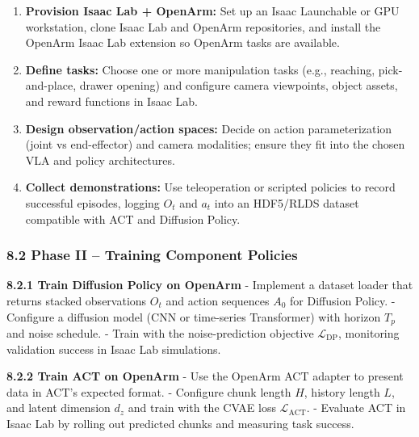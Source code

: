 \documentclass[
]{article}
\providecommand{\tightlist}{%
  \setlength{\itemsep}{0pt}\setlength{\parskip}{0pt}}
\theoremstyle{remark}
\begin{document}
\begin{enumerate}
\def\labelenumi{\arabic{enumi}.}
\tightlist
\item
  \textbf{Provision Isaac Lab + OpenArm:} Set up an Isaac Launchable or
  GPU workstation, clone Isaac Lab and OpenArm repositories, and install
  the OpenArm Isaac Lab extension so OpenArm tasks are
  available. \cite{isaaclab-github,act-openarm-notes}
\item
  \textbf{Define tasks:} Choose one or more manipulation tasks (e.g.,
  reaching, pick-and-place, drawer opening) and configure camera
  viewpoints, object assets, and reward functions in Isaac
  Lab. \cite{isaaclab-github,act-openarm-notes}
\item
  \textbf{Design observation/action spaces:} Decide on action
  parameterization (joint vs end-effector) and camera modalities; ensure
  they fit into the chosen VLA and policy
  architectures. \cite{act-openarm-notes,openvla-notes}
\item
  \textbf{Collect demonstrations:} Use teleoperation or scripted
  policies to record successful episodes, logging \(O_t\) and \(a_t\)
  into an HDF5/RLDS dataset compatible with ACT and Diffusion
  Policy. \cite{diffusion-policy-repo,act-openarm-notes}
\end{enumerate}

\subsubsection{8.2 Phase II -- Training Component
Policies}\label{phase-ii-training-component-policies}

\textbf{8.2.1 Train Diffusion Policy on OpenArm} - Implement a dataset
loader that returns stacked observations \(O_t\) and action sequences
\(A_0\) for Diffusion Policy. \cite{diffusion-policy-repo,diffpolicy-theory-notes,act-openarm-notes} -
Configure a diffusion model (CNN or time-series Transformer) with
horizon \(T_p\) and noise schedule. \cite{diffusion-policy-repo,diffusion-policy2023} - Train with
the noise-prediction objective \(\mathcal{L}_{\text{DP}}\), monitoring
validation success in Isaac Lab simulations. \cite{diffusion-policy2023,diffpolicy-theory-notes}

\textbf{8.2.2 Train ACT on OpenArm} - Use the OpenArm ACT adapter to
present data in ACT's expected format. \cite{act-project-page,act-openarm-notes} - Configure
chunk length \(H\), history length \(L\), and latent dimension \(d_z\)
and train with the CVAE loss
\(\mathcal{L}_{\text{ACT}}\). \cite{act-hf-summary,act2023} - Evaluate ACT in
Isaac Lab by rolling out predicted chunks and measuring task success.
\end{document}
